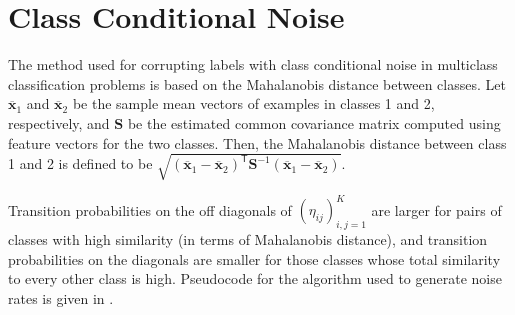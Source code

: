 \documentclass[letterpaper]{article} %
\newcommand{\bx}{{\bm{x}}}
\newcommand{\T}{{\mathsf{T}}}
\begin{document}
\section{Class Conditional Noise}
\label{app:class-conditional-noise}



The method used for corrupting labels with class conditional noise in multiclass classification problems is based on the Mahalanobis distance between classes.
Let $\overline{\bx}_1$ and $\overline{\bx}_2$ be the sample mean vectors of examples in classes 1 and 2, respectively,
and $\mathbf{S}$ be the estimated common covariance matrix computed using feature vectors for the two classes.
Then, the Mahalanobis distance between class 1 and 2 is defined to be
$\sqrt{(\overline{\bx}_1-\overline{\bx}_2)^\T \mathbf{S}^{-1} (\overline{\bx}_1-\overline{\bx}_2)}$.


Transition probabilities on the off diagonals of $(\eta_{ij})_{i,j=1}^K$ are larger for pairs of classes with high similarity (in terms of Mahalanobis distance), and transition probabilities on the diagonals are smaller for those classes whose total similarity to every other class is high.
Pseudocode for the algorithm used to generate noise rates is given in .
\end{document}
